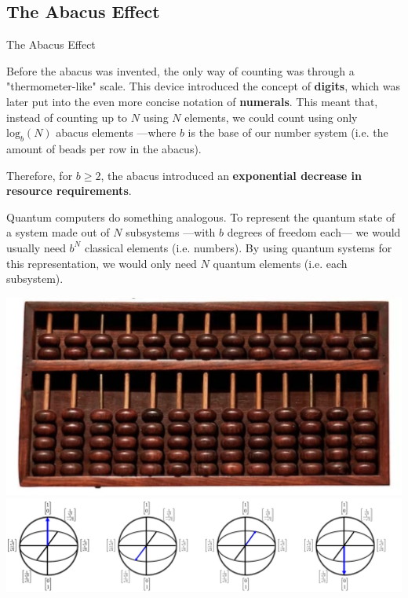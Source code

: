 \documentclass[9pt, handout, aspectratio=169]{beamer}		%
\begin{document}

	\subsection{The Abacus Effect}

	\begin{frame}{The Abacus Effect}

		\medskip

		Before the abacus was invented, the only way of counting was through a "thermometer-like" scale. This device introduced the concept of \textbf{digits}, which was later put into the even more concise notation of \textbf{numerals}. This meant that, instead of counting up to $N$ using $N$ elements, we could count using only $\text{log}_b (N)$ abacus elements ---where $b$ is the base of our number system (i.e. the amount of beads per row in the abacus).

		\begin{multicols}{2}

		 	Therefore, for $b\geq2$, the abacus introduced an \textbf{exponential decrease in resource requirements}.

			\medskip

			Quantum computers do something analogous. To represent the quantum state of a system made out of $N$ subsystems ---with $b$ degrees of freedom each--- we would usually need $b^N$ classical elements (i.e. numbers). By using quantum systems for this representation, we would only need $N$ quantum elements (i.e. each subsystem).

			\columnbreak

			\begin{center}
				\includegraphics[width=.30\paperwidth]{Figures/abacus} \\
				\vspace{10pt}
				\includegraphics[width=.34\paperwidth]{Figures/qubits}
			\end{center}

		\end{multicols}

	\end{frame}
\end{document}
